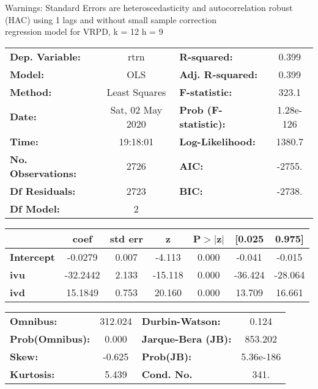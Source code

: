 Warnings: \newline
 [1] Standard Errors are heteroscedasticity and autocorrelation robust (HAC) using 1 lags and without small sample correction\\ 

regression model for VRPD, k = 12 h = 9\begin{center}
\begin{tabular}{lclc}
\toprule
\textbf{Dep. Variable:}    &       rtrn       & \textbf{  R-squared:         } &     0.399   \\
\textbf{Model:}            &       OLS        & \textbf{  Adj. R-squared:    } &     0.399   \\
\textbf{Method:}           &  Least Squares   & \textbf{  F-statistic:       } &     323.1   \\
\textbf{Date:}             & Sat, 02 May 2020 & \textbf{  Prob (F-statistic):} & 1.28e-126   \\
\textbf{Time:}             &     19:18:01     & \textbf{  Log-Likelihood:    } &    1380.7   \\
\textbf{No. Observations:} &        2726      & \textbf{  AIC:               } &    -2755.   \\
\textbf{Df Residuals:}     &        2723      & \textbf{  BIC:               } &    -2738.   \\
\textbf{Df Model:}         &           2      & \textbf{                     } &             \\
\bottomrule
\end{tabular}
\begin{tabular}{lcccccc}
                   & \textbf{coef} & \textbf{std err} & \textbf{z} & \textbf{P$> |$z$|$} & \textbf{[0.025} & \textbf{0.975]}  \\
\midrule
\textbf{Intercept} &      -0.0279  &        0.007     &    -4.113  &         0.000        &       -0.041    &       -0.015     \\
\textbf{ivu}       &     -32.2442  &        2.133     &   -15.118  &         0.000        &      -36.424    &      -28.064     \\
\textbf{ivd}       &      15.1849  &        0.753     &    20.160  &         0.000        &       13.709    &       16.661     \\
\bottomrule
\end{tabular}
\begin{tabular}{lclc}
\textbf{Omnibus:}       & 312.024 & \textbf{  Durbin-Watson:     } &     0.124  \\
\textbf{Prob(Omnibus):} &   0.000 & \textbf{  Jarque-Bera (JB):  } &   853.202  \\
\textbf{Skew:}          &  -0.625 & \textbf{  Prob(JB):          } & 5.36e-186  \\
\textbf{Kurtosis:}      &   5.439 & \textbf{  Cond. No.          } &      341.  \\
\bottomrule
\end{tabular}
\end{center}

